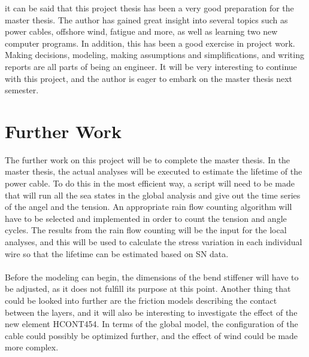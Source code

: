it can be said that this project thesis has been a very good preparation for the master thesis. The author has gained great insight into several topics such as power cables, offshore wind, fatigue and more, as well as learning two new computer programs. In addition, this has been a good exercise in project work. Making decisions, modeling, making assumptions and simplifications, and writing reports are all parts of being an engineer. It will be very interesting to continue with this project, and the author is eager to embark on the master thesis next semester.

\section{Further Work}
The further work on this project will be to complete the master thesis. In the master thesis, the actual analyses will be executed to estimate the lifetime of the power cable. To do this in the most efficient way, a script will need to be made that will run all the sea states in the global analysis and give out the time series of the angel and the tension. An appropriate rain flow counting algorithm will have to be selected and implemented in order to count the tension and angle cycles. The results from the rain flow counting will be the input for the local analyses, and this will be used to calculate the stress variation in each individual wire so that the lifetime can be estimated based on SN data. \\\\Before the modeling can begin, the dimensions of the bend stiffener will have to be adjusted, as it does not fulfill its purpose at this point. Another thing that could be looked into further are the friction models describing the contact between the layers, and it will also be interesting to investigate the effect of the new element HCONT454. In terms of the global model, the configuration of the cable could possibly be optimized further, and the effect of wind could be made more complex. 

